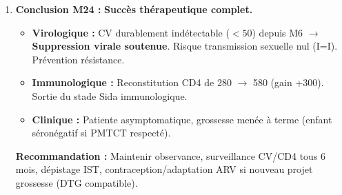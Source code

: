 \documentclass[11pt]{article}
\begin{document}
\begin{exoresolu}
\begin{enumerate}
\begin{itemize}
    \end{itemize}
    À M3 (12 sem), on est en \textbf{fin de phase 2}. Une CV à 2000 copies/mL est \textbf{attendue et normale} pour une CV initiale haute (500 000). La poursuite de la baisse vers l'indétectabilité à M6 confirme l'efficacité. L'inquiétude n'est justifiée que si CV $> 1000$ à M6 (échec).
    \item \textbf{Conclusion M24 :} \textbf{Succès thérapeutique complet.}
    \begin{itemize}
        \item \textbf{Virologique :} CV durablement indétectable ($< 50$) depuis M6 $\rightarrow$ \textbf{Suppression virale soutenue}. Risque transmission sexuelle nul (I=I). Prévention résistance.
        \item \textbf{Immunologique :} Reconstitution CD4 de 280 $\rightarrow$ 580 (gain +300). Sortie du stade Sida immunologique.
        \item \textbf{Clinique :} Patiente asymptomatique, grossesse menée à terme (enfant séronégatif si PMTCT respecté).
    \end{itemize}
    \textbf{Recommandation :} Maintenir observance, surveillance CV/CD4 tous 6 mois, dépistage IST, contraception/adaptation ARV si nouveau projet grossesse (DTG compatible).
\end{enumerate}
\end{exoresolu}
\end{document}
